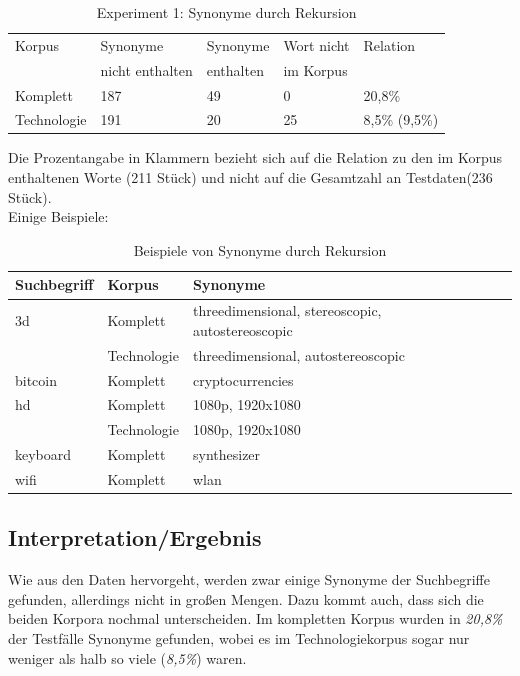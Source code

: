 \documentclass[12pt,a4paper]{report}
\begin{document}
\begin{table}[H]
\caption{Experiment 1: Synonyme durch Rekursion}
\begin{center}
\begin{tabular}{|l||l|l|l|l|}
\hline
Korpus & Synonyme & Synonyme  & Wort nicht  & Relation\\
 & nicht enthalten & enthalten & im Korpus & \\

\hline
 Komplett & 187 & 49 & 0 & 20,8\% \\
 \hline
 Technologie & 191 & 20 & 25 & 8,5\% (9,5\%)\\
 \hline
 
\end{tabular}
\end{center}
\end{table}
		Die Prozentangabe in Klammern bezieht sich auf die Relation zu den im Korpus enthaltenen Worte (211 Stück) und nicht auf die Gesamtzahl an Testdaten(236 Stück).\\
		
Einige Beispiele:\\
 
\begin{table}[H]
\caption{Beispiele von Synonyme durch Rekursion}
\begin{center}
\begin{tabular}{|l||l|l|l|l|}
\hline
Suchbegriff & Korpus & Synonyme   \\

\hline
 3d & Komplett & threedimensional, stereoscopic, autostereoscopic \\
  	& Technologie& threedimensional, autostereoscopic\\
 \hline	
 bitcoin	& Komplett	& cryptocurrencies	\\
 	\hline
 hd	 & Komplett 	& 1080p, 1920x1080 \\
  	 & Technologie	& 1080p, 1920x1080 \\
 	\hline
 keyboard	& Komplett & synthesizer	\\
 	\hline
 wifi	&	Komplett &	wlan\\
 	\hline
 
\end{tabular}
\end{center}
\end{table}
		
		\subsection{Interpretation/Ergebnis}
		Wie aus den Daten hervorgeht, werden zwar einige Synonyme der Suchbegriffe gefunden, allerdings nicht in großen Mengen. Dazu kommt auch, dass sich die beiden Korpora nochmal unterscheiden. Im kompletten Korpus wurden in \textit{20,8\%} der Testfälle Synonyme gefunden, wobei es im Technologiekorpus sogar nur weniger als halb so viele (\textit{8,5\%}) waren.\\
		
\end{document}
